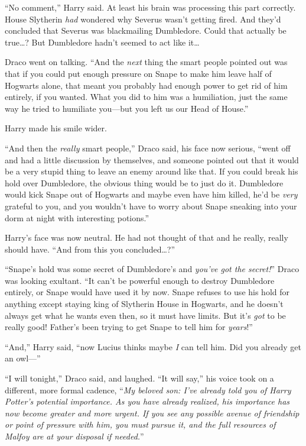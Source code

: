 “No comment,” Harry said. At least his brain was processing this part correctly. House Slytherin \emph{had} wondered why Severus wasn’t getting fired. And they’d concluded that Severus was blackmailing Dumbledore. Could that actually be true…? But Dumbledore hadn’t seemed to act like it…

Draco went on talking. “And the \emph{next} thing the smart people pointed out was that if you could put enough pressure on Snape to make him leave half of Hogwarts alone, that meant you probably had enough power to get rid of him entirely, if you wanted. What you did to him was a humiliation, just the same way he tried to humiliate you—but you left us our Head of House.”

Harry made his smile wider.

“And then the \emph{really} smart people,” Draco said, his face now serious, “went off and had a little discussion by themselves, and someone pointed out that it would be a very stupid thing to leave an enemy around like that. If you could break his hold over Dumbledore, the obvious thing would be to just do it. Dumbledore would kick Snape out of Hogwarts and maybe even have him killed, he’d be \emph{very} grateful to you, and you wouldn’t have to worry about Snape sneaking into your dorm at night with interesting potions.”

Harry’s face was now neutral. He had not thought of that and he really, really should have. “And from this you concluded…?”

“Snape’s hold was some secret of Dumbledore’s and \emph{you’ve got the secret!}” Draco was looking exultant. “It can’t be powerful enough to destroy Dumbledore entirely, or Snape would have used it by now. Snape refuses to use his hold for anything except staying king of Slytherin House in Hogwarts, and he doesn’t always get what he wants even then, so it must have limits. But it’s \emph{got} to be really good! Father’s been trying to get Snape to tell him for \emph{years}!”

“And,” Harry said, “now Lucius thinks maybe \emph{I} can tell him. Did you already get an owl—”

“I will tonight,” Draco said, and laughed. “It will say,” his voice took on a different, more formal cadence, “\emph{My beloved son: I’ve already told you of Harry Potter’s potential importance. As you have already realized, his importance has now become greater and more urgent. If you see any possible avenue of friendship or point of pressure with him, you must pursue it, and the full resources of Malfoy are at your disposal if needed.}”

